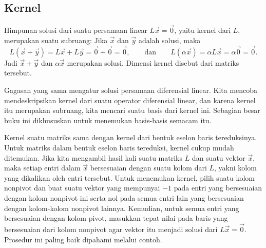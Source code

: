 \subsection{Kernel}

Himpunan solusi dari suatu persamaan linear $L\vec{x} = \vec{0}$,
yaitu kernel dari $L$, merupakan suatu subruang:
Jika $\vec{x}$ dan $\vec{y}$ adalah solusi,
maka
\begin{equation*}
L(\vec{x}+\vec{y}) =
L\vec{x}+L\vec{y} =
\vec{0}+\vec{0} = \vec{0} ,
\qquad \text{dan} \qquad
L(\alpha \vec{x}) =
\alpha L \vec{x} =
\alpha \vec{0} = \vec{0}.
\end{equation*}
Jadi $\vec{x}+\vec{y}$ dan $\alpha \vec{x}$ merupakan solusi.
Dimensi kernel disebut \emph{} dari
matriks tersebut.

Gagasan yang sama mengatur solusi persamaan diferensial
linear. Kita mencoba mendeskripsikan kernel dari suatu operator diferensial
linear, dan karena kernel itu merupakan subruang, kita mencari suatu basis dari
kernel ini. Sebagian besar buku ini dikhususkan untuk menemukan basis-basis semacam itu.

Kernel suatu matriks sama dengan kernel dari bentuk eselon baris
tereduksinya. Untuk matriks dalam bentuk eselon baris tereduksi, kernel cukup mudah
ditemukan. Jika kita mengambil hasil kali suatu matriks $L$ dan suatu vektor $\vec{x}$,
maka setiap entri dalam
$\vec{x}$ bersesuaian dengan suatu kolom dari $L$, yakni kolom yang dikalikan oleh entri tersebut.
Untuk menemukan kernel,
pilih suatu
kolom nonpivot dan buat suatu vektor yang mempunyai $-1$ pada entri
yang bersesuaian dengan kolom nonpivot ini serta nol pada semua entri lain
yang bersesuaian dengan kolom-kolom nonpivot lainnya.
Kemudian, untuk semua entri
yang bersesuaian dengan kolom pivot, masukkan tepat nilai pada
baris yang bersesuaian dari kolom nonpivot agar vektor itu menjadi
solusi dari $L \vec{x} = \vec{0}$.
Prosedur ini paling baik dipahami melalui contoh.

